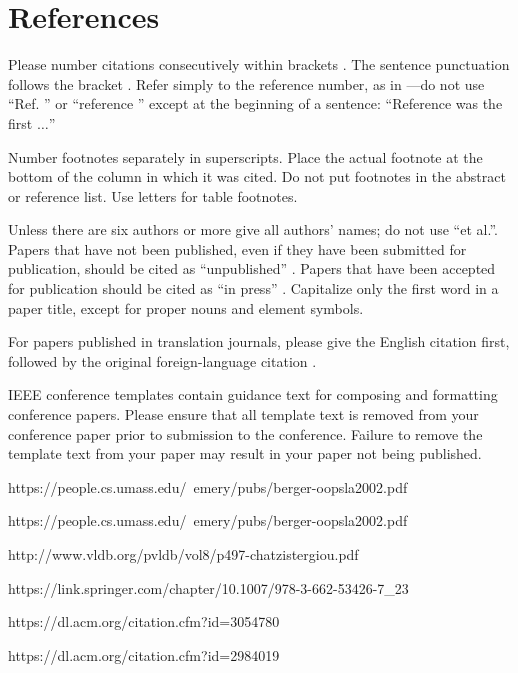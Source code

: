 \documentclass[conference]{IEEEtran}
\begin{document}
\section*{References}

Please number citations consecutively within brackets \cite{IEEEhowto:IEEEtranpage}. The 
sentence punctuation follows the bracket \cite{b2}. Refer simply to the reference 
number, as in \cite{b3}---do not use ``Ref. \cite{b3}'' or ``reference \cite{b3}'' except at 
the beginning of a sentence: ``Reference \cite{b3} was the first $\ldots$''

Number footnotes separately in superscripts. Place the actual footnote at 
the bottom of the column in which it was cited. Do not put footnotes in the 
abstract or reference list. Use letters for table footnotes.

Unless there are six authors or more give all authors' names; do not use 
``et al.''. Papers that have not been published, even if they have been 
submitted for publication, should be cited as ``unpublished'' \cite{b4}. Papers 
that have been accepted for publication should be cited as ``in press'' \cite{b5}. 
Capitalize only the first word in a paper title, except for proper nouns and 
element symbols.

For papers published in translation journals, please give the English 
citation first, followed by the original foreign-language citation \cite{b6}.




\vspace{12pt}
\color{red}
IEEE conference templates contain guidance text for composing and formatting conference papers. Please ensure that all template text is removed from your conference paper prior to submission to the conference. Failure to remove the template text from your paper may result in your paper not being published.

https://people.cs.umass.edu/~emery/pubs/berger-oopsla2002.pdf

https://people.cs.umass.edu/~emery/pubs/berger-oopsla2002.pdf

http://www.vldb.org/pvldb/vol8/p497-chatzistergiou.pdf

https://link.springer.com/chapter/10.1007/978-3-662-53426-7_23

https://dl.acm.org/citation.cfm?id=3054780

https://dl.acm.org/citation.cfm?id=2984019
\end{document}

